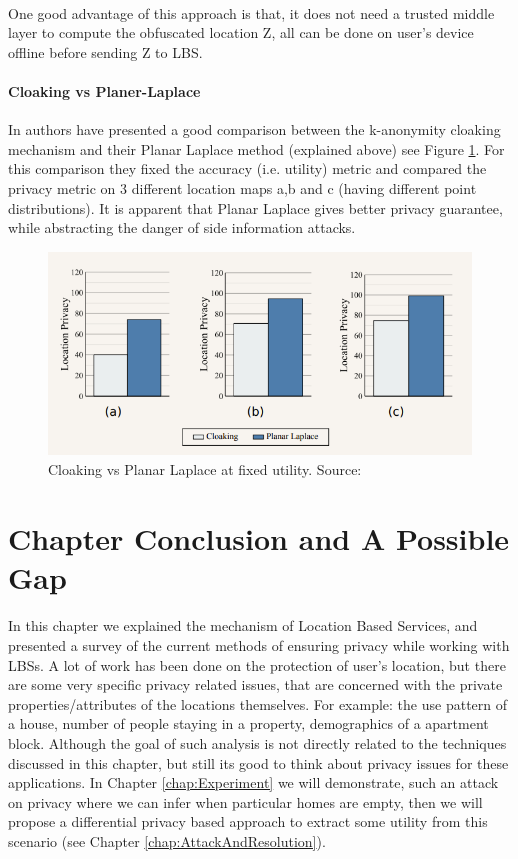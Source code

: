 \documentclass[12pt]{report}
\theoremstyle{named}
\begin{document}
\paragraph{}
One good advantage of this approach is that, it does not need a trusted middle layer to compute the obfuscated location Z, all can be done on user's device offline before sending Z to LBS.
\paragraph{Cloaking vs Planer-Laplace}
In \cite{andres2013geo} authors have presented a good comparison between the k-anonymity cloaking mechanism and their Planar Laplace method (explained above) see Figure \ref{fig:CloakingVsPlanar}. For this comparison they fixed the accuracy (i.e. utility) metric and compared the privacy metric on 3 different location maps a,b and c (having different point distributions). It is apparent that Planar Laplace gives better privacy guarantee, while abstracting the danger of side information attacks.

\begin{figure}[ht]
\centering
        \includegraphics[width=120mm,scale=1]{Images/CloakingVsLaplace.PNG}
    \caption{Cloaking vs Planar Laplace at fixed utility. Source:\cite{andres2013geo}}
    \label{fig:CloakingVsPlanar}
\end{figure}


\section{Chapter Conclusion and A Possible Gap}
\paragraph{}
In this chapter we explained the mechanism of Location Based Services, and presented a survey of the current methods of ensuring privacy while working with LBSs. A lot of work has been done on the protection of user's location, but there are some very specific privacy related issues, that are concerned with the private properties/attributes of the locations themselves. For example: the use pattern of a house, number of people staying in a property, demographics of a apartment block. Although the goal of such analysis is not directly related to the techniques discussed in this chapter, but still its good to think about privacy issues for these applications. In Chapter \ref{chap:Experiment} we will demonstrate, such an attack on privacy where we can infer when particular homes are empty, then we will propose a differential privacy based approach to extract some utility from this scenario (see Chapter \ref{chap:AttackAndResolution}).
\end{document}
